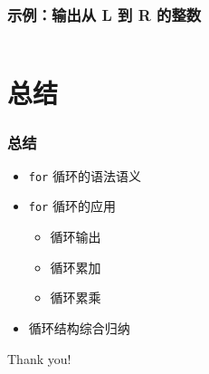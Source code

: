 \begin{frame}[fragile]
    \frametitle{示例：输出从 L 到 R 的整数}

    \begin{columns}[T]

        

        
    \end{columns}
\end{frame}


\section{总结}

\begin{frame}[fragile]
    \frametitle{总结}

    \begin{itemize}
        \item \lstinline|for| 循环的语法语义

        \item \lstinline|for| 循环的应用

            \begin{itemize}
                \item 循环输出
                \item 循环累加
                \item 循环累乘
            \end{itemize}

        \item 循环结构综合归纳
    \end{itemize}
\end{frame}

\begin{frame}
    \begin{center}
        {\Huge Thank you!}
    \end{center}
\end{frame}


